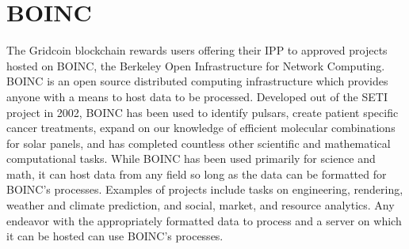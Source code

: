 \section{BOINC}

\label{sec:boinc}

The Gridcoin blockchain rewards users offering their IPP to approved projects hosted on BOINC, the Berkeley Open Infrastructure for Network Computing.  BOINC is an open source distributed computing infrastructure which provides anyone with a means to host data to be processed.  Developed out of the SETI project in 2002, BOINC has been used to identify pulsars, create patient specific cancer treatments, expand on our knowledge of efficient molecular combinations for solar panels, and has completed countless other scientific and mathematical computational tasks.  While BOINC has been used primarily for science and math, it can host data from any field so long as the data can be formatted for BOINC’s processes.  Examples of projects include tasks on engineering, rendering, weather and climate prediction, and social, market, and resource analytics.  Any endeavor with the appropriately formatted data to process and a server on which it can be hosted can use BOINC’s processes.